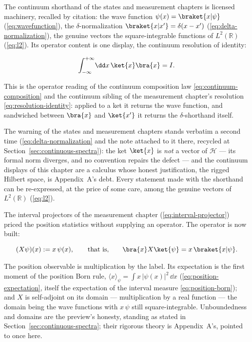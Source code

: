 The continuum shorthand of the states and measurement chapters is licensed machinery, recalled by citation: the wave function $\psi(x) = \braket{x|\psi}$ (\eqref{eq:wavefunction}), the $\delta$-normalization $\braket{x|x'} = \delta(x - x')$ (\eqref{eq:delta-normalization}), the genuine vectors the square-integrable functions of $L^2(\mathbb{R})$ (\eqref{eq:l2}). Its operator content is one display, the continuum resolution of identity:
\begin{linenomath}
    \begin{equation}
        \int_{-\infty}^{+\infty}\!\dd x\,\ket{x}\bra{x} = I .
        \label{eq:position-resolution}
    \end{equation}
\end{linenomath}
This is the operator reading of the continuum composition law \eqref{eq:continuum-composition} and the continuum sibling of the measurement chapter's resolution \eqref{eq:resolution-identity}: applied to a ket it returns the wave function, and sandwiched between $\bra{x}$ and $\ket{x'}$ it returns the $\delta$-shorthand itself.

\begin{note}
The warning of the states and measurement chapters stands verbatim a second time (\eqref{eq:delta-normalization} and the note attached to it there, recycled at Section~\ref{sec:continuous-spectra}): the ket $\ket{x}$ is \emph{not} a vector of $\mathcal{H}$ --- its formal norm diverges, and no convention repairs the defect --- and the continuum displays of this chapter are a calculus whose honest justification, the rigged Hilbert space, is Appendix~A's debt. Every statement made with the shorthand can be re-expressed, at the price of some care, among the genuine vectors of $L^2(\mathbb{R})$ (\eqref{eq:l2}).
\end{note}

The interval projectors of the measurement chapter (\eqref{eq:interval-projector}) priced the position statistics without supplying an operator. The operator is now built:
\begin{linenomath}
    \begin{equation}
        (X\psi)(x) := x\,\psi(x), \qquad\text{that is,}\qquad \bra{x}X\ket{\psi} = x\,\braket{x|\psi} .
        \label{eq:x-multiplication}
    \end{equation}
\end{linenomath}
The position observable is multiplication by the label. Its expectation is the first moment of the position Born rule, $\langle x\rangle_\psi = \int\!x\,|\psi(x)|^2\,\dd x$ (\eqref{eq:position-expectation}, itself the expectation of the interval measure \eqref{eq:position-born}); and $X$ is self-adjoint on its domain --- multiplication by a real function --- the domain being the wave functions with $x\,\psi$ still square-integrable. Unboundedness and domains are the preview's honesty, standing as stated in Section~\ref{sec:continuous-spectra}; their rigorous theory is Appendix~A's, pointed to once here.


